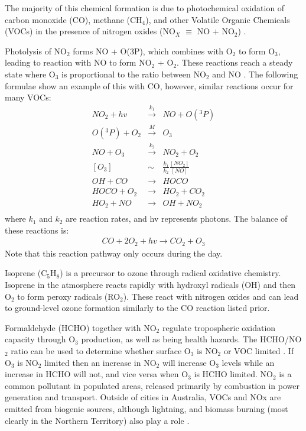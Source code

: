     The majority of this chemical formation is due to photochemical oxidation of carbon monoxide (CO), methane (CH$_4$), and other Volatile Organic Chemicals (VOCs) in the presence of nitrogen oxides (NO$_X$ $\equiv$ NO $+$ NO$_2$) \citep{Stevenson2006}.

    Photolysis of NO$_2$ forms NO + O(3P), which combines with O$_2$ to form O$_3$, leading to reaction with NO to form NO$_2$ + O$_2$.
    These reactions reach a steady state where O$_3$ is proportional to the ratio between NO$_2$ and NO \citep{Sillman_2002}.
    The following formulae show an example of this with CO, however, similar reactions occur for many VOCs:
    \begin{eqnarray*}
      NO_2 + hv &\overset{k_1}{\rightarrow}& NO + O({}^3 P) \\
      O({}^3 P) + O_2 &\overset{M}{\rightarrow}& O_3 \\
      NO + O_3 &\overset{k_2}{\rightarrow}& NO_2 + O_2 \\
      \left[O_3\right] &\sim& \frac{k_1}{k_2} \frac{\left[NO_2\right]}{\left[NO\right]} \\
      OH + CO &{\rightarrow}& HOCO \\
      HOCO + O_2 &{\rightarrow}& HO_2 + CO_2 \\
      HO_2 + NO &{\rightarrow}& OH + NO_2 \\
    \end{eqnarray*}
    where $k_1$ and $k_2$ are reaction rates, and hv represents photons.
    The balance of these reactions is:
    \begin{eqnarray*} CO + 2O_2 + hv {\rightarrow} CO_2 + O_3 \end{eqnarray*}
    Note that this reaction pathway only occurs during the day.

    Isoprene (C$_5$H$_8$) is a precursor to ozone through radical oxidative chemistry. Isoprene in the atmosphere reacts rapidly with hydroxyl radicals (OH) and then O$_2$ to form peroxy radicals (RO$_2$).
    These react with nitrogen oxides and can lead to ground-level ozone formation similarly to the CO reaction listed prior.

    Formaldehyde (HCHO) together with NO$_2$ regulate tropospheric oxidation capacity through O$_3$ production, as well as being health hazards.
    The HCHO/NO$_2$ ratio can be used to determine whether surface O$_3$ is NO$_2$ or VOC limited \citep{Mahajan2015}.
    If O$_3$ is NO$_2$ limited then an increase in NO$_2$ will increase O$_3$ levels while an increase in HCHO will not, and vice versa when O$_3$ is HCHO limited.
    NO$_2$ is a common pollutant in populated areas, released primarily by combustion in power generation and transport. 
    Outside of cities in Australia, VOCs and NOx are emitted from biogenic sources, although lightning, and biomass burning (most clearly in the Northern Territory) also play a role \citep{Guenther2006, VanDerA2008}.

